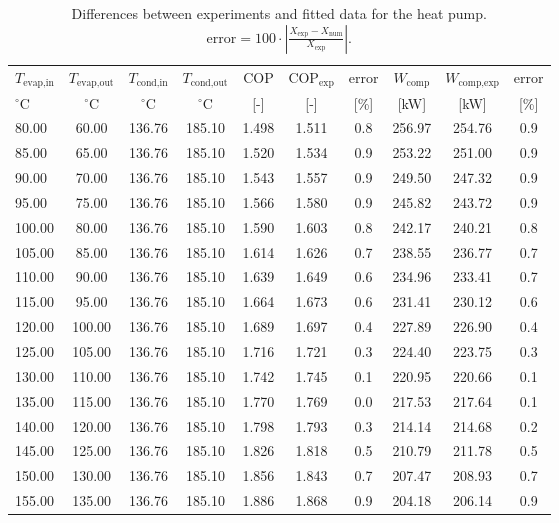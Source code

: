\documentclass[english]{SPFShortReport}
\begin{document}
\begin{table}[!ht]
\centering
\caption{Differences between experiments and fitted data for the heat pump.         $\text{error}=100 \cdot |\frac{X_\text{exp}-X_\text{num}}{X_\text{exp}}|$.}
\begin{adjustbox}{max width =\textwidth}
\begin{tabular}{l | c c c c c c c c c } 
\hline
\hline
$T_\text{evap,in}$ &$T_\text{evap,out}$ &$T_\text{cond,in}$ &$T_\text{cond,out}$ &COP &COP$_\text{exp}$ &error &$W_\text{comp}$ &$W_\text{comp,exp}$ &error \\ 
$^\circ$C &$^\circ$C &$^\circ$C &$^\circ$C &[-] &[-] &[\%] &[kW] &[kW] &[\%]\\ 
\hline
80.00 & 60.00 & 136.76 & 185.10 & 1.498 & 1.511 & 0.8 & 256.97 & 254.76 & 0.9\\ 
85.00 & 65.00 & 136.76 & 185.10 & 1.520 & 1.534 & 0.9 & 253.22 & 251.00 & 0.9\\ 
90.00 & 70.00 & 136.76 & 185.10 & 1.543 & 1.557 & 0.9 & 249.50 & 247.32 & 0.9\\ 
95.00 & 75.00 & 136.76 & 185.10 & 1.566 & 1.580 & 0.9 & 245.82 & 243.72 & 0.9\\ 
100.00 & 80.00 & 136.76 & 185.10 & 1.590 & 1.603 & 0.8 & 242.17 & 240.21 & 0.8\\ 
105.00 & 85.00 & 136.76 & 185.10 & 1.614 & 1.626 & 0.7 & 238.55 & 236.77 & 0.7\\ 
110.00 & 90.00 & 136.76 & 185.10 & 1.639 & 1.649 & 0.6 & 234.96 & 233.41 & 0.7\\ 
115.00 & 95.00 & 136.76 & 185.10 & 1.664 & 1.673 & 0.6 & 231.41 & 230.12 & 0.6\\ 
120.00 & 100.00 & 136.76 & 185.10 & 1.689 & 1.697 & 0.4 & 227.89 & 226.90 & 0.4\\ 
125.00 & 105.00 & 136.76 & 185.10 & 1.716 & 1.721 & 0.3 & 224.40 & 223.75 & 0.3\\ 
130.00 & 110.00 & 136.76 & 185.10 & 1.742 & 1.745 & 0.1 & 220.95 & 220.66 & 0.1\\ 
135.00 & 115.00 & 136.76 & 185.10 & 1.770 & 1.769 & 0.0 & 217.53 & 217.64 & 0.1\\ 
140.00 & 120.00 & 136.76 & 185.10 & 1.798 & 1.793 & 0.3 & 214.14 & 214.68 & 0.2\\ 
145.00 & 125.00 & 136.76 & 185.10 & 1.826 & 1.818 & 0.5 & 210.79 & 211.78 & 0.5\\ 
150.00 & 130.00 & 136.76 & 185.10 & 1.856 & 1.843 & 0.7 & 207.47 & 208.93 & 0.7\\ 
155.00 & 135.00 & 136.76 & 185.10 & 1.886 & 1.868 & 0.9 & 204.18 & 206.14 & 0.9\\ 

\end{tabular}
\end{adjustbox}
\end{table}
\end{document}
